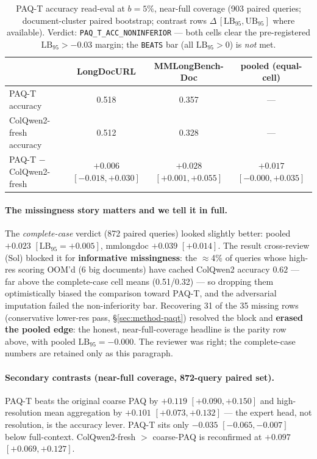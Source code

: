 \documentclass[11pt,letterpaper]{article}
\newcommand{\paq}{\textsc{PAQ}}
\newcommand{\paqt}{\textsc{PAQ-T}}
\newcommand{\lb}{\mathrm{LB}_{95}}
\begin{document}
\begin{table}[t]
\centering\small
\caption{\paqt{} accuracy read-eval at $b{=}5\%$, near-full coverage (903 paired queries;
document-cluster paired bootstrap; contrast rows $\Delta\,[\lb,\mathrm{UB}_{95}]$ where
available). Verdict: \texttt{PAQ\_T\_ACC\_NONINFERIOR} --- both cells clear the pre-registered
$\lb > -0.03$ margin; the \texttt{BEATS} bar (all $\lb>0$) is \emph{not} met.}
\label{tab:paqtacc}
\begin{tabular}{lccc}
\toprule
 & LongDocURL & MMLongBench-Doc & pooled (equal-cell) \\
\midrule
\paqt{} accuracy & 0.518 & 0.357 & --- \\
ColQwen2-fresh accuracy & 0.512 & 0.328 & --- \\
\midrule
\paqt{} $-$ ColQwen2-fresh & $+0.006$ $[-0.018,+0.030]$ & $+0.028$ $[+0.001,+0.055]$ & $+0.017$ $[-0.000,+0.035]$ \\
\bottomrule
\end{tabular}
\end{table}

\paragraph{The missingness story matters and we tell it in full.} The \emph{complete-case}
verdict (872 paired queries) looked slightly better: pooled $+0.023$ $[\lb=+0.005]$, mmlongdoc
$+0.039$ $[+0.014]$. The result cross-review (Sol) blocked it for \textbf{informative
missingness}: the $\approx$4\% of queries whose high-res scoring OOM'd (6 big documents) have
cached ColQwen2 accuracy $0.62$ --- far above the complete-case cell means (0.51/0.32) --- so
dropping them optimistically biased the comparison toward \paqt{}, and the adversarial imputation
failed the non-inferiority bar. Recovering 31 of the 35 missing rows (conservative lower-res
pass, \S\ref{sec:method-paqt}) resolved the block and \textbf{erased the pooled edge}: the
honest, near-full-coverage headline is the parity row above, with pooled $\lb=-0.000$. The
reviewer was right; the complete-case numbers are retained only as this paragraph.

\paragraph{Secondary contrasts (near-full coverage, 872-query paired set).} \paqt{} beats the
original coarse \paq{} by $+0.119$ $[+0.090,+0.150]$ and high-resolution mean aggregation by
$+0.101$ $[+0.073,+0.132]$ --- the expert head, not resolution, is the accuracy lever. \paqt{}
sits only $-0.035$ $[-0.065,-0.007]$ below full-context. ColQwen2-fresh $>$ coarse-\paq{} is
reconfirmed at $+0.097$ $[+0.069,+0.127]$.
\end{document}
